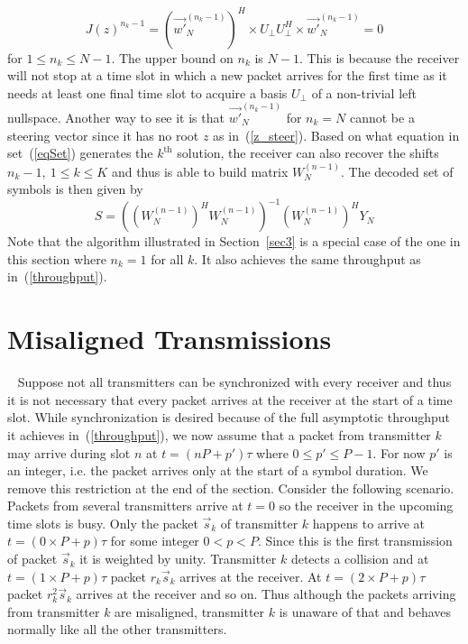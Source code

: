 \documentclass[10pt, a4paper, twocolumn]{IEEEtran}
\begin{document}
\begin{equation}
\label{eqSet}
J(z)^{n_k-1} = (\overrightarrow{w'}_N^{(n_k-1)})^H\times U_{\bot} U_{\bot}^H\times \overrightarrow{w'}_N^{(n_k-1)} = 0
\end{equation} 
\noindent for $1\leq n_k\leq N-1$. The upper bound on $n_k$ is $N-1$. This is because the receiver will not stop at a time slot in which a new packet arrives for the first time as it needs at least one final time slot to acquire a basis $U_{\bot}$ of a non-trivial left nullspace. Another way to see it is that $\overrightarrow{w'}_N^{(n_k-1)}$ for $n_k = N$ cannot be a steering vector since it has no root $z$ as in~(\ref{z_steer}). Based on what equation in set~(\ref{eqSet}) generates the $k^{\text{th}}$ solution, the receiver can also recover the shifts $n_k-1,~1\leq k\leq K$ and thus is able to build matrix $W_N^{(n-1)}$. The decoded set of symbols is then given by
\begin{equation}
\hat{S} = ((W_N^{(n-1)})^H W_N^{(n-1)})^{-1} (W_N^{(n-1)})^H Y_N
\end{equation}  
\noindent Note that the algorithm illustrated in Section~\ref{sec3} is a special case of the one in this section where $n_k=1$ for all $k$. It also achieves the same throughput as in~(\ref{throughput}). 

\section{Misaligned Transmissions}~\label{sec5}
Suppose not all transmitters can be synchronized with every receiver and thus it is not necessary that every packet arrives at the receiver at the start of a time slot. While synchronization is desired because of the full asymptotic throughput it achieves in~(\ref{throughput}), we now assume that a packet from transmitter $k$ may arrive during slot $n$ at $t=(nP+p')\tau$ where $0\leq p'\leq P-1$. For now $p'$ is an integer, i.e. the packet arrives only at the start of a symbol duration. We remove this restriction at the end of the section. Consider the following scenario. Packets from several transmitters arrive at $t=0$ so the receiver in the upcoming time slots is busy. Only the packet $\overrightarrow{s}_k$ of transmitter $k$ happens to arrive at $t = (0\times P+p)\tau$ for some integer $0<p<P$. Since this is the first transmission of packet $\overrightarrow{s}_k$ it is weighted by unity. Transmitter $k$ detects a collision and at $t = (1\times P+p)\tau$ packet $r_k\overrightarrow{s}_k$ arrives at the receiver. At $t=(2\times P+p)\tau$ packet $r_k^2\overrightarrow{s}_k$ arrives at the receiver and so on. Thus although the packets arriving from transmitter $k$ are misaligned, transmitter $k$ is unaware of that and behaves normally like all the other transmitters.\\
\end{document}
